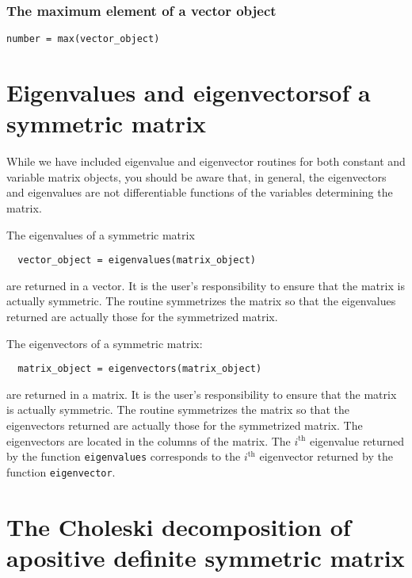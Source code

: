 \documentclass{admbmanual}
\begin{document}
\subsubsection{The maximum element of a vector object}
\begin{lstlisting}
number = max(vector_object)
\end{lstlisting}
\bigskip


\section{Eigenvalues and eigenvectors\br of a symmetric matrix}

While we have included eigenvalue and eigenvector routines for
both constant and variable matrix objects, you should be aware
that, in general, the eigenvectors and eigenvalues are not differentiable
functions of the variables determining the matrix.  

The eigenvalues of a symmetric matrix
\begin{lstlisting}
  vector_object = eigenvalues(matrix_object)
\end{lstlisting}
are returned in a vector. It is the user's responsibility to 
ensure that the matrix is actually symmetric. The routine symmetrizes 
the matrix so that the eigenvalues returned are actually those for
the symmetrized matrix.

The eigenvectors of a symmetric matrix:
\begin{lstlisting}
  matrix_object = eigenvectors(matrix_object)
\end{lstlisting}
are returned in a matrix. It is the user's responsibility to 
ensure that the matrix is actually symmetric. The routine symmetrizes 
the matrix so that the eigenvectors returned are actually those for
the symmetrized matrix. The eigenvectors are located in the
columns of the matrix. The $i^\textrm{th}$ eigenvalue returned by the
function \texttt{eigenvalues} corresponds to the $i^\textrm{th}$ eigenvector  
returned by the function \texttt{eigenvector}.



\section{The Choleski decomposition of a\br positive definite symmetric matrix}
\end{document}
